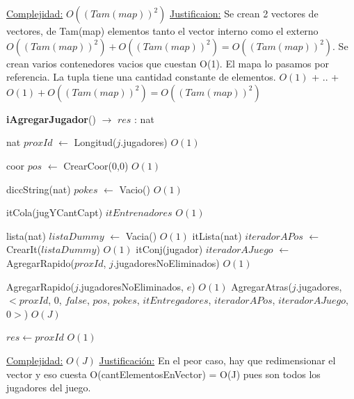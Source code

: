 \begin{Algoritmos}
\begin{algorithm}[H]
\begin{algorithmic}[1]
\medskip
\Statex \underline{Complejidad:} $O((Tam(map))^2)$
\Statex \underline{Justificaion:} Se crean 2 vectores de vectores, de Tam(map) elementos tanto el vector interno como el externo $O((Tam(map))^2) + O((Tam(map))^2) = O((Tam(map))^2)$. Se crean varios contenedores vacios que cuestan O(1). El mapa lo pasamos por referencia. La tupla tiene una cantidad constante de elementos. $O(1)$ + .. + $O(1) + O((Tam(map))^2) = O((Tam(map))^2)$

\end{algorithmic}
\end{algorithm}


\begin{algorithm}[H]
{\textbf{iAgregarJugador}() $\to$ $res$ : nat}
\begin{algorithmic}[1]

\State nat $proxId$ $\gets$ Longitud($j$.jugadores)   \Comment $O(1)$


\State coor $pos$ $\gets$ CrearCoor(0,0) \Comment $O(1)$

\State diccString(nat) $pokes$ $\gets$ Vacio() \Comment $O(1)$
 
\State itCola(jugYCantCapt) $itEntrenadores$  \Comment $O(1)$

\State lista(nat) $listaDummy$ $\gets$ Vacia() \Comment $O(1)$
\State itLista(nat) $iteradorAPos$ $\gets$ CrearIt($listaDummy$) \Comment $O(1)$
\State itConj(jugador) $iteradorAJuego$ $\gets$ AgregarRapido($proxId$, $j$.jugadoresNoEliminados) \Comment $O(1)$

\State AgregarRapido($j$.jugadoresNoEliminados, $e$) \Comment $O(1)$
\State AgregarAtras($j$.jugadores, $<proxId$, 0, $false$, $pos$, $pokes$, $itEntregadores$, $iteradorAPos$, $iteradorAJuego$, $0>$) \Comment $O(J)$

\State $res \gets proxId$ \Comment $O(1)$

\medskip
\State \underline{Complejidad:} $O(J)$
\State \underline{Justificaci\'on:} En el peor caso, hay que redimensionar el vector y eso cuesta O(cantElementosEnVector) = O(J) pues son todos los jugadores del juego.


\end{algorithmic}
\end{algorithm}
\end{Algoritmos}
